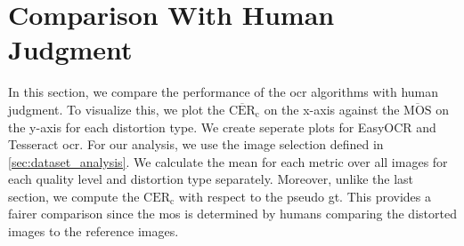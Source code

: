 \section{Comparison With Human Judgment}
\label{sec:comparison_with_human_judgment}

In this section, we compare the performance of the \gls{ocr} algorithms with human judgment.
To visualize this, we plot the $\overline{\text{CER}}_{\text{c}}$ on the x-axis against the $\overline{\text{MOS}}$ on the y-axis for each distortion type.
We create seperate plots for EasyOCR and Tesseract \gls{ocr}.
For our analysis, we use the image selection defined in \autoref{sec:dataset_analysis}.
We calculate the mean for each metric over all images for each quality level and distortion type separately.
Moreover, unlike the last section, we compute the $\text{CER}_{\text{c}}$ with respect to the pseudo \gls{gt}.
This provides a fairer comparison since the \gls{mos} is determined by humans comparing the distorted images to the reference images.

